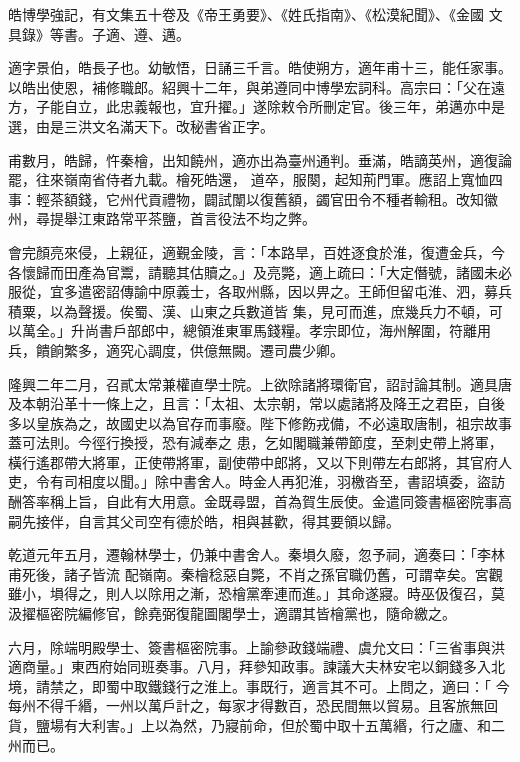 \begin{pinyinscope}
 皓博學強記，有文集五十卷及《帝王勇要》、《姓氏指南》、《松漠紀聞》、《金國
 文具錄》等書。子適、遵、邁。



 適字景伯，皓長子也。幼敏悟，日誦三千言。皓使朔方，適年甫十三，能任家事。以皓出使恩，補修職郎。紹興十二年，與弟遵同中博學宏詞科。高宗曰：「父在遠方，子能自立，此忠義報也，宜升擢。」遂除敕令所刪定官。後三年，弟邁亦中是選，由是三洪文名滿天下。改秘書省正字。



 甫數月，皓歸，忤秦檜，出知饒州，適亦出為臺州通判。垂滿，皓謫英州，適復論罷，往來嶺南省侍者九載。檜死皓還，
 道卒，服闋，起知荊門軍。應詔上寬恤四事：輕茶額錢，它州代貢禮物，闢試闈以復舊額，蠲官田令不種者輸租。改知徽州，尋提舉江東路常平茶鹽，首言役法不均之弊。



 會完顏亮來侵，上親征，適覲金陵，言：「本路旱，百姓逐食於淮，復遭金兵，今各懷歸而田產為官鬻，請聽其估贖之。」及亮斃，適上疏曰：「大定僭號，諸國未必服從，宜多遣密詔傳諭中原義士，各取州縣，因以畀之。王師但留屯淮、泗，募兵積粟，以為聲援。俟蜀、漢、山東之兵數道皆
 集，見可而進，庶幾兵力不頓，可以萬全。」升尚書戶部郎中，總領淮東軍馬錢糧。孝宗即位，海州解圍，符離用兵，饋餉繁多，適究心調度，供億無闕。遷司農少卿。



 隆興二年二月，召貳太常兼權直學士院。上欲除諸將環衛官，詔討論其制。適具唐及本朝沿革十一條上之，且言：「太祖、太宗朝，常以處諸將及降王之君臣，自後多以皇族為之，故國史以為官存而事廢。陛下修飭戎備，不必遠取唐制，祖宗故事蓋可法則。今徑行換授，恐有減奉之
 患，乞如閣職兼帶節度，至刺史帶上將軍，橫行遙郡帶大將軍，正使帶將軍，副使帶中郎將，又以下則帶左右郎將，其官府人吏，令有司相度以聞。」除中書舍人。時金人再犯淮，羽檄沓至，書詔填委，盜訪酬答率稱上旨，自此有大用意。金既尋盟，首為賀生辰使。金遣同簽書樞密院事高嗣先接伴，自言其父司空有德於皓，相與甚歡，得其要領以歸。



 乾道元年五月，遷翰林學士，仍兼中書舍人。秦塤久廢，忽予祠，適奏曰：「李林甫死後，諸子皆流
 配嶺南。秦檜稔惡自斃，不肖之孫官職仍舊，可謂幸矣。宮觀雖小，塤得之，則人以除用之漸，恐檜黨牽連而進。」其命遂寢。時巫伋復召，莫汲擢樞密院編修官，餘堯弼復龍圖閣學士，適謂其皆檜黨也，隨命繳之。



 六月，除端明殿學士、簽書樞密院事。上諭參政錢端禮、虞允文曰：「三省事與洪適商量。」東西府始同班奏事。八月，拜參知政事。諫議大夫林安宅以銅錢多入北境，請禁之，即蜀中取鐵錢行之淮上。事既行，適言其不可。上問之，適曰：「
 今每州不得千緡，一州以萬戶計之，每家才得數百，恐民間無以貿易。且客旅無回貨，鹽場有大利害。」上以為然，乃寢前命，但於蜀中取十五萬緡，行之廬、和二州而已。




\end{pinyinscope}
